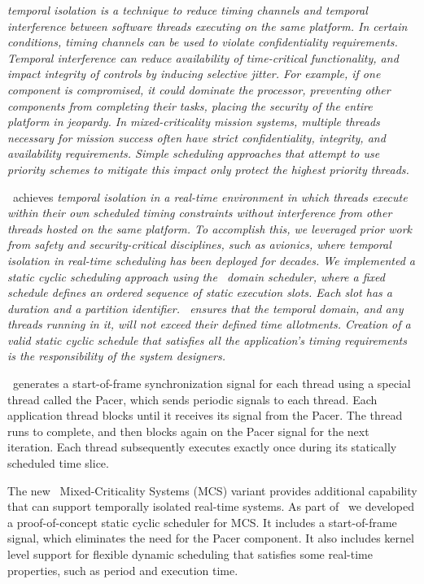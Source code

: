 
\it{temporal isolation} is a technique to reduce timing channels and temporal 
interference between software threads executing on the same platform. 
In certain conditions,
timing channels can be used to violate confidentiality requirements. 
Temporal interference can reduce availability of time-critical functionality, 
and impact integrity of controls by inducing selective jitter. 
For example, if one component is compromised, it could dominate the processor, 
preventing other components from completing their tasks, placing the security 
of the entire platform in jeopardy. 
In mixed-criticality mission systems, 
multiple threads necessary for mission success often 
have strict confidentiality, integrity, and availability requirements. 
Simple scheduling approaches that attempt to use priority schemes to mitigate 
this impact only protect the highest priority threads.

\briefcase\ achieves \it{temporal isolation} in a real-time
environment in which threads execute within
their own scheduled timing constraints without interference from other
threads hosted on the same platform. To accomplish this, we leveraged
prior work from safety and security-critical disciplines, such as
avionics, where temporal isolation in real-time scheduling has been
deployed for decades. We implemented a static cyclic scheduling
approach using the \selFour\ domain scheduler, where a fixed schedule
defines an ordered sequence of static execution slots. Each slot has a
duration and a partition identifier.  \selFour\ ensures that the
temporal domain, and any threads running in it, will not exceed their defined
time allotments. Creation of a valid static cyclic schedule that
satisfies all the application's timing requirements is the
responsibility of the system designers.

\briefcase\ generates a start-of-frame synchronization signal for each thread using
a special thread called the Pacer, which sends periodic signals
to each thread. Each application thread blocks until it receives its
signal from the Pacer. The thread runs to complete, and then
blocks again on the Pacer signal for the next iteration. 
Each thread subsequently executes
exactly once during its statically scheduled time slice.

The new \selFour\ Mixed-Criticality Systems (MCS) variant provides
additional capability that can support temporally isolated
real-time systems. 
As part of \briefcase\ we developed a proof-of-concept static cyclic
scheduler for MCS.
It includes a start-of-frame signal, which
eliminates the need for the Pacer component. It also includes kernel
level support for flexible dynamic scheduling that satisfies some
real-time properties, such as period and execution time.

